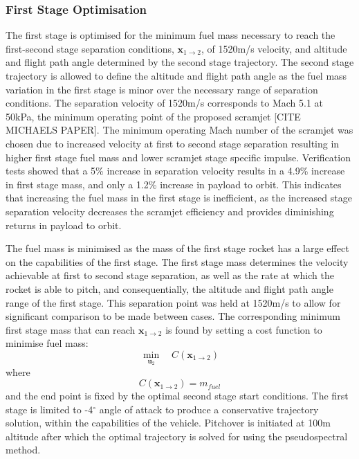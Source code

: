 \documentclass[]{aiaa-tc}
\begin{document}
\subsubsection{First Stage Optimisation}
The first stage is optimised for the minimum fuel mass necessary to reach the first-second stage separation conditions, $\textbf{x}_{1 \rightarrow 2}$, of 1520m/s velocity, and altitude and flight path angle determined by the second stage trajectory. The second stage trajectory is allowed to define the altitude and flight path angle as the fuel mass variation in the first stage is minor over the necessary range of separation conditions. The separation velocity of 1520m/s corresponds to Mach 5.1 at 50kPa, the minimum operating point of the proposed scramjet [CITE MICHAELS PAPER]. The minimum operating Mach number of the scramjet was chosen due to increased velocity at first to second stage separation resulting in higher first stage fuel mass and lower scramjet stage specific impulse. Verification tests showed that a 5\% increase in separation velocity results in a 4.9\% increase in first stage mass, and only a 1.2\% increase in payload to orbit. This indicates that increasing the fuel mass in the first stage is inefficient, as the increased stage separation velocity decreases the scramjet efficiency and provides diminishing returns in payload to orbit.  

The fuel mass is minimised as the mass of the first stage rocket has a large effect on the capabilities of the first stage. The first stage mass determines the velocity achievable at first to second stage separation, as well as the rate at which the rocket is able to pitch, and consequentially, the altitude and flight path angle range of the first stage. 
This separation point was held at 1520m/s to allow for significant comparison to be made between cases. The corresponding minimum first stage mass that can reach $\textbf{x}_{1 \rightarrow 2}$ is found by setting a cost function to minimise fuel mass:
\begin{equation}
\min\limits_{\textbf{u}_2} \quad  C(\textbf{x}_{1 \rightarrow 2})
\end{equation}
where
\begin{equation}
C(\textbf{x}_{1 \rightarrow 2}) = m_{fuel}
\end{equation}
and the end point is fixed by the optimal second stage start conditions. The first stage is limited to -4$^\circ$ angle of attack to produce a conservative trajectory solution, within the capabilities of the vehicle. Pitchover is initiated at 100m altitude after which the optimal trajectory is solved for using the pseudospectral method.
\end{document}
